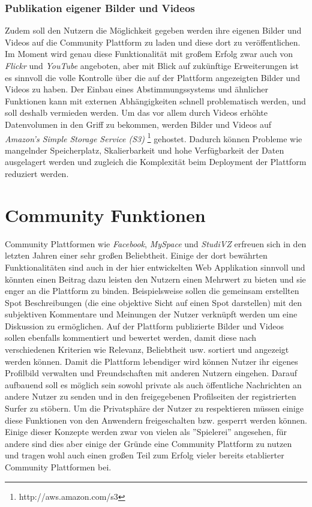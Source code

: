 \subsubsection{Publikation eigener Bilder und Videos}
Zudem soll den Nutzern die Möglichkeit gegeben werden ihre eigenen
Bilder und Videos auf die Community Plattform zu laden und diese dort
zu veröffentlichen. Im Moment wird genau diese Funktionalität mit
großem Erfolg zwar auch von \textit{Flickr} und \textit{YouTube}
angeboten, aber mit Blick auf zukünftige Erweiterungen ist es sinnvoll
die volle Kontrolle über die auf der Plattform angezeigten Bilder und
Videos zu haben. Der Einbau eines Abstimmungssystems und ähnlicher
Funktionen kann mit externen Abhängigkeiten schnell problematisch
werden, und soll deshalb vermieden werden. Um das vor allem durch
Videos erhöhte Datenvolumen in den Griff zu bekommen, werden Bilder
und Videos auf \textit{Amazon's Simple Storage Service (S3)}
\footnote{http://aws.amazon.com/s3} gehostet. Dadurch können Probleme
wie mangelnder Speicherplatz, Skalierbarkeit und hohe Verfügbarkeit
der Daten ausgelagert werden und zugleich die Komplexität beim
Deployment der Plattform reduziert werden.

\section{Community Funktionen}
Community Plattformen wie \textit{Facebook}, \textit{MySpace} und
\textit{StudiVZ} erfreuen sich in den letzten Jahren einer sehr großen
Beliebtheit. Einige der dort bewährten Funktionalitäten sind auch in
der hier entwickelten Web Applikation sinnvoll und könnten einen
Beitrag dazu leisten den Nutzern einen Mehrwert zu bieten und sie
enger an die Plattform zu binden. Beispielsweise sollen die gemeinsam
erstellten Spot Beschreibungen (die eine objektive Sicht auf einen
Spot darstellen) mit den subjektiven Kommentare und Meinungen der
Nutzer verknüpft werden um eine Diskussion zu ermöglichen. Auf der
Plattform publizierte Bilder und Videos sollen ebenfalls kommentiert
und bewertet werden, damit diese nach verschiedenen Kriterien wie
Relevanz, Beliebtheit usw. sortiert und angezeigt werden können. Damit
die Plattform lebendiger wird können Nutzer ihr eigenes Profilbild
verwalten und Freundschaften mit anderen Nutzern eingehen. Darauf
aufbauend soll es möglich sein sowohl private als auch öffentliche
Nachrichten an andere Nutzer zu senden und in den freigegebenen
Profilseiten der registrierten Surfer zu stöbern. Um die Privatsphäre
der Nutzer zu respektieren müssen einige diese Funktionen von den
Anwendern freigeschalten bzw. gesperrt werden können. Einige dieser
Konzepte werden zwar von vielen als ''Spielerei'' angesehen, für
andere sind dies aber einige der Gründe eine Community Plattform zu
nutzen und tragen wohl auch einen großen Teil zum Erfolg vieler
bereits etablierter Community Plattformen bei.

